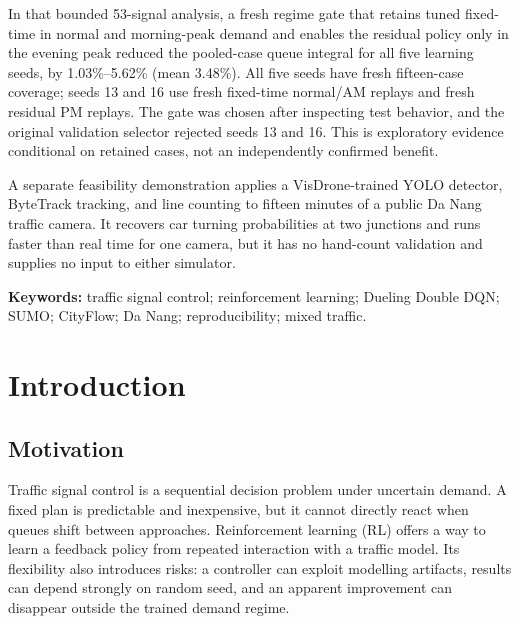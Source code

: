 \documentclass[12pt,a4paper]{report}
\begin{document}
In that bounded 53-signal analysis, a fresh regime gate that retains tuned fixed-time in normal and morning-peak demand and enables the residual policy only in the evening peak reduced the pooled-case queue integral for all five learning seeds, by 1.03\%--5.62\% (mean 3.48\%). All five seeds have fresh fifteen-case coverage; seeds 13 and 16 use fresh fixed-time normal/AM replays and fresh residual PM replays. The gate was chosen after inspecting test behavior, and the original validation selector rejected seeds 13 and 16. This is exploratory evidence conditional on retained cases, not an independently confirmed benefit.

A separate feasibility demonstration applies a VisDrone-trained YOLO detector, ByteTrack tracking, and line counting to fifteen minutes of a public Da Nang traffic camera. It recovers car turning probabilities at two junctions and runs faster than real time for one camera, but it has no hand-count validation and supplies no input to either simulator.

\noindent\textbf{Keywords:} traffic signal control; reinforcement learning; Dueling Double DQN; SUMO; CityFlow; Da Nang; reproducibility; mixed traffic.

\tableofcontents
\listoffigures
\listoftables
\clearpage
{}

\chapter{Introduction}

\section{Motivation}
Traffic signal control is a sequential decision problem under uncertain demand. A fixed plan is predictable and inexpensive, but it cannot directly react when queues shift between approaches. Reinforcement learning (RL) offers a way to learn a feedback policy from repeated interaction with a traffic model. Its flexibility also introduces risks: a controller can exploit modelling artifacts, results can depend strongly on random seed, and an apparent improvement can disappear outside the trained demand regime.
\end{document}
